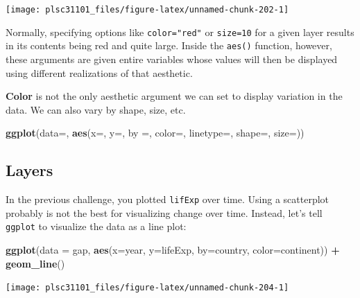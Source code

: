 \documentclass[]{book}
\newenvironment{Shaded}{\begin{snugshade}}{\end{snugshade}}
\newcommand{\KeywordTok}[1]{\textcolor[rgb]{0.13,0.29,0.53}{\textbf{#1}}}
\newcommand{\DataTypeTok}[1]{\textcolor[rgb]{0.13,0.29,0.53}{#1}}
\newcommand{\StringTok}[1]{\textcolor[rgb]{0.31,0.60,0.02}{#1}}
\newcommand{\OperatorTok}[1]{\textcolor[rgb]{0.81,0.36,0.00}{\textbf{#1}}}
\newcommand{\NormalTok}[1]{#1}
\begin{document}
\begin{center}\texttt{[image: plsc31101\_files/figure-latex/unnamed-chunk-202-1]} \end{center}

Normally, specifying options like \texttt{color="red"} or
\texttt{size=10} for a given layer results in its contents being red and
quite large. Inside the \texttt{aes()} function, however, these
arguments are given entire variables whose values will then be displayed
using different realizations of that aesthetic.

\textbf{Color} is not the only aesthetic argument we can set to display
variation in the data. We can also vary by shape, size, etc.

\begin{Shaded}
\begin{Highlighting}[]
\KeywordTok{ggplot}\NormalTok{(}\DataTypeTok{data=}\NormalTok{, }\KeywordTok{aes}\NormalTok{(}\DataTypeTok{x=}\NormalTok{, }\DataTypeTok{y=}\NormalTok{, }\DataTypeTok{by =}\NormalTok{, }\DataTypeTok{color=}\NormalTok{, }\DataTypeTok{linetype=}\NormalTok{, }\DataTypeTok{shape=}\NormalTok{, }\DataTypeTok{size=}\NormalTok{))}
\end{Highlighting}
\end{Shaded}

\subsection{Layers}\label{layers}

In the previous challenge, you plotted \texttt{lifExp} over time. Using
a scatterplot probably is not the best for visualizing change over time.
Instead, let's tell \texttt{ggplot} to visualize the data as a line
plot:

\begin{Shaded}
\begin{Highlighting}[]
\KeywordTok{ggplot}\NormalTok{(}\DataTypeTok{data =}\NormalTok{ gap, }\KeywordTok{aes}\NormalTok{(}\DataTypeTok{x=}\NormalTok{year, }\DataTypeTok{y=}\NormalTok{lifeExp, }\DataTypeTok{by=}\NormalTok{country, }\DataTypeTok{color=}\NormalTok{continent)) }\OperatorTok{+}\StringTok{ }
\StringTok{  }\KeywordTok{geom_line}\NormalTok{()}
\end{Highlighting}
\end{Shaded}

\begin{center}\texttt{[image: plsc31101\_files/figure-latex/unnamed-chunk-204-1]} \end{center}
\end{document}
